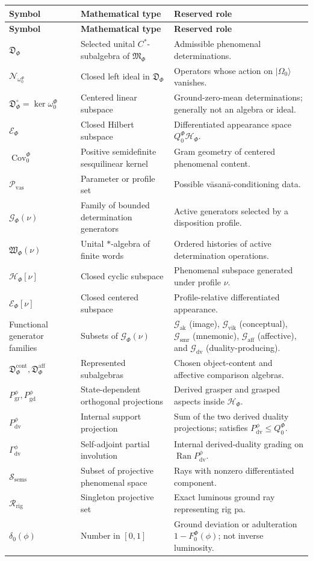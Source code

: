 \documentclass[11pt,reqno]{scrartcl}
\newcommand{\scrHF}{\mathscr H_{\Phi}}
\newcommand{\algF}{\mathfrak M_{\Phi}}
\newcommand{\omegaF}{\omega_{0}^{\Phi}}
\newcommand{\QzeroF}{Q_{0}^{\Phi}}
\newcommand{\ket}[1]{\lvert #1\rangle}
\newcommand{\detAlg}{\mathfrak D_{\Phi}}
\newcommand{\nullIdeal}{\mathcal N_{\omega_{0}^{\Phi}}}
\newcommand{\centDet}{\mathfrak D_{\Phi}^{\circ}}
\newcommand{\appSpace}{\mathscr E_{\Phi}}
\newcommand{\vasSpace}{\mathcal P_{\mathrm{vas}}}
\newcommand{\vas}{\nu}
\newcommand{\genSet}{\mathcal G_{\Phi}}
\newcommand{\wordSet}{\mathfrak W_{\Phi}}
\newcommand{\Hvas}{\mathscr H_{\Phi}[\nu]}
\newcommand{\Evas}{\mathscr E_{\Phi}[\nu]}
\newcommand{\Gak}{\mathcal G_{\mathrm{ak}}}
\newcommand{\Gvik}{\mathcal G_{\mathrm{vik}}}
\newcommand{\Gsmr}{\mathcal G_{\mathrm{smr}}}
\newcommand{\Gaff}{\mathcal G_{\mathrm{aff}}}
\newcommand{\Gdv}{\mathcal G_{\mathrm{dv}}}
\newcommand{\contentAlg}{\mathfrak D_{\Phi}^{\mathrm{cont}}}
\newcommand{\affectAlg}{\mathfrak D_{\Phi}^{\mathrm{aff}}}
\newcommand{\Pdual}{P_{\mathrm{dv}}^{\phi}}
\newcommand{\Pgrasper}{P_{\mathrm{gr}}^{\phi}}
\newcommand{\Pgrasped}{P_{\mathrm{gd}}^{\phi}}
\newcommand{\Gammadual}{\Gamma_{\mathrm{dv}}^{\phi}}
\newcommand{\semsSet}{\mathscr S_{\mathrm{sems}}}
\newcommand{\rigRay}{\mathscr R_{\mathrm{rig}}}
\DeclareMathOperator{\Cov}{Cov}
\theoremstyle{plain}
\theoremstyle{definition}
\theoremstyle{remark}
\begin{document}
\begin{longtable}{>{\raggedright\arraybackslash}p{}
>{\raggedright\arraybackslash}p{}
>{\raggedright\arraybackslash}p{}}
\toprule
\textbf{Symbol} & \textbf{Mathematical type} & \textbf{Reserved role} \\
\midrule
\endfirsthead
\toprule
\textbf{Symbol} & \textbf{Mathematical type} & \textbf{Reserved role} \\
\midrule
\endhead
$\detAlg$ & Selected unital $C^*$-subalgebra of $\algF$ & Admissible phenomenal determinations. \\
$\nullIdeal$ & Closed left ideal in $\detAlg$ & Operators whose action on $\ket{\Omega_0}$ vanishes. \\
$\centDet=\ker\omegaF$ & Centered linear subspace & Ground-zero-mean determinations; generally not an algebra or ideal. \\
$\appSpace$ & Closed Hilbert subspace & Differentiated appearance space $\QzeroF\scrHF$. \\
$\Cov_0^{\Phi}$ & Positive semidefinite sesquilinear kernel & Gram geometry of centered phenomenal content. \\
$\vasSpace$ & Parameter or profile set & Possible v\=asan\=a-conditioning data. \\
$\genSet(\vas)$ & Family of bounded determination generators & Active generators selected by a disposition profile. \\
$\wordSet(\vas)$ & Unital $*$-algebra of finite words & Ordered histories of active determination operations. \\
$\Hvas$ & Closed cyclic subspace & Phenomenal subspace generated under profile $\vas$. \\
$\Evas$ & Closed centered subspace & Profile-relative differentiated appearance. \\
Functional generator families & Subsets of $\genSet(\vas)$ & $\Gak$ (image), $\Gvik$ (conceptual), $\Gsmr$ (mnemonic), $\Gaff$ (affective), and $\Gdv$ (duality-producing). \\
$\contentAlg,\affectAlg$ & Represented subalgebras & Chosen object-content and affective comparison algebras. \\
$\Pgrasper,\Pgrasped$ & State-dependent orthogonal projections & Derived grasper and grasped aspects inside $\scrHF$. \\
$\Pdual$ & Internal support projection & Sum of the two derived duality projections; satisfies $\Pdual\leq\QzeroF$. \\
$\Gammadual$ & Self-adjoint partial involution & Internal derived-duality grading on $\operatorname{Ran}\Pdual$. \\
$\semsSet$ & Subset of projective phenomenal space & Rays with nonzero differentiated component. \\
$\rigRay$ & Singleton projective set & Exact luminous ground ray representing rig pa. \\
$\delta_0(\phi)$ & Number in $[0,1]$ & Ground deviation or adulteration $1-F_0^{\Phi}(\phi)$; not inverse luminosity. \\
\bottomrule
\end{longtable}
\end{document}
